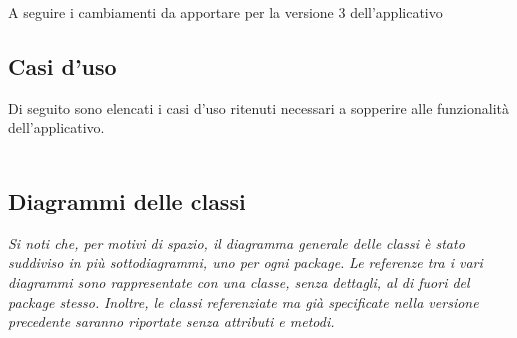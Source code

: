 A seguire i cambiamenti da apportare per la versione 3 dell'applicativo

\subsection{Casi d'uso}
Di seguito sono elencati i casi d'uso ritenuti necessari a sopperire alle funzionalità
dell'applicativo.
\\\\





\pagebreak


\pagebreak
\subsection{Diagrammi delle classi}

\textit{Si noti che, per motivi di spazio, il diagramma generale delle classi è stato suddiviso in più sottodiagrammi, uno per ogni package.}
\textit{Le referenze tra i vari diagrammi sono rappresentate con una classe, senza dettagli, al di fuori del package stesso.}
\textit{Inoltre, le classi referenziate ma già specificate nella versione precedente saranno riportate senza attributi e metodi.}



